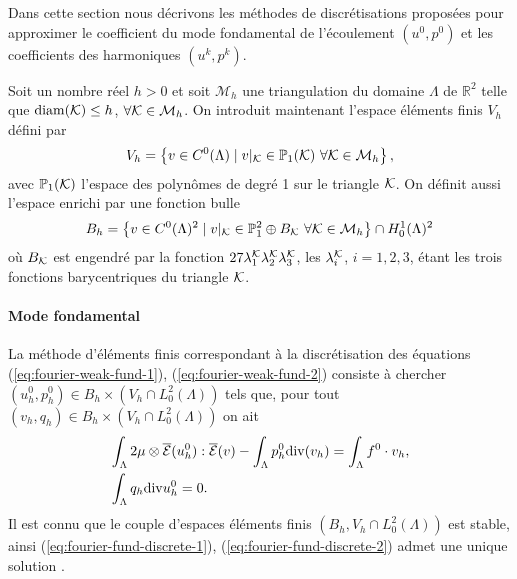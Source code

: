 Dans cette section nous décrivons les méthodes de discrétisations
proposées pour approximer le coefficient du mode fondamental de
l'écoulement $(u^0, p^0)$ et les coefficients des harmoniques $(u^k,
p^k)$.

Soit un nombre réel $h > 0$ et soit $\mathcal M_h$ une triangulation
du domaine $\Lambda$ de $\mathbb R^2$ telle que $\operatorname{diam}({\mathcal K})\leq h$,
$\forall {\mathcal K}\in \mathcal M_h$. On introduit maintenant l'espace
éléments finis $V_h$ défini par
\begin{equation}
  V_h = \left\{ v\in C^0(\Lambda)\mid v|_{\mathcal K} \in \mathbb
    P_1({\mathcal K})\ \forall {\mathcal K}\in\mathcal M_h \right\},
\end{equation}
avec $\mathbb P_1({\mathcal K})$ l'espace des polynômes de degré 1 sur le
triangle ${\mathcal K}$. On définit aussi l'espace enrichi par une fonction bulle
\begin{equation}
  B_h = \left\{ v \in C^0(\Lambda)^2 \mid v|_{\mathcal K} \in \mathbb P_1^2\oplus
    B_{\mathcal K}\ \forall {\mathcal K}\in\mathcal M_h \right\} \cap H_0^1(\Lambda)^2
\end{equation}
où $B_{\mathcal K}$ est engendré par la fonction $27 \lambda_1^{\mathcal K}
\lambda_2^{\mathcal K}\lambda_3^{\mathcal K}$, les $\lambda_i^{\mathcal K}$, $i = 1,2,3$, étant les
trois fonctions barycentriques du triangle ${\mathcal K}$.

\paragraph{Mode fondamental}
La méthode d'éléments finis correspondant à la discrétisation des équations
(\ref{eq:fourier-weak-fund-1}), (\ref{eq:fourier-weak-fund-2})
consiste à chercher $(u^0_h, p^0_h)\in B_h\times(V_h \cap
L^2_0(\Lambda))$ tels que, pour tout $(v_h, q_h)\in
B_h\times(V_h \cap L^2_0(\Lambda))$ on ait
\begin{align}
  &\int_\Lambda
  2\mu\otimes\overline{\mathcal E}(u^0_h):\overline{\mathcal E}(v)
  -\int_\Lambda p^0_h\mathrm{div}(v_h) = \int_\Lambda f^0\cdot v_h, \label{eq:fourier-fund-discrete-1}\\
  & \int_\Lambda q_h\mathrm{div} u^0_h = 0.\label{eq:fourier-fund-discrete-2}
\end{align}
Il est connu que le couple d'espaces éléments finis $(B_h, V_h \cap
L^2_0(\Lambda))$ est stable, ainsi (\ref{eq:fourier-fund-discrete-1}),
(\ref{eq:fourier-fund-discrete-2}) admet une unique solution \cite{Temam1977}.

